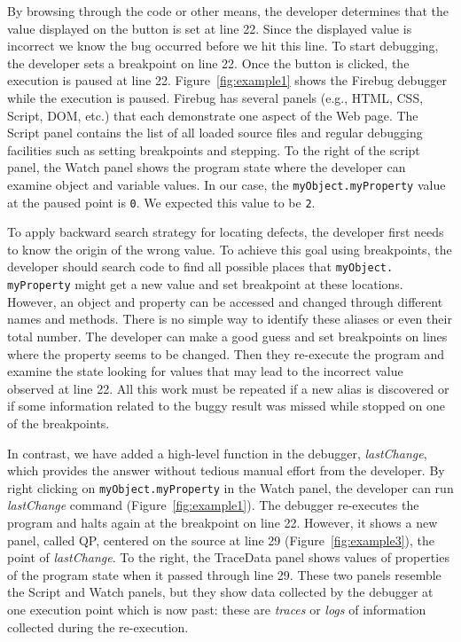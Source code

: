 \documentclass{sig-alternate}
\begin{document}
By browsing through the code or other means\cite{Barton},
 the developer determines that the value displayed on the 
button is set at line 22. Since the displayed value is incorrect we know 
the bug occurred before we hit this line.
To start debugging, the developer sets a breakpoint
on line 22. Once the button is clicked, the execution is paused at line
22. Figure~\ref{fig:example1} shows the Firebug debugger while the
execution is paused. Firebug has several panels (e.g., HTML, CSS,
Script, DOM, etc.) that each demonstrate one aspect of the Web page.
The Script panel contains the list of all loaded source
files and regular debugging facilities such as setting breakpoints and
stepping. To the right of the script panel, the Watch panel shows the program state
where the developer can examine object and variable values. In our case, the
\texttt{myObject.myProperty} value at the paused point is \texttt{0}. We expected this value to be \texttt{2}.


To apply backward search strategy for locating defects, the developer
first needs to know the origin of the wrong value. To achieve this
goal using breakpoints, the developer should search code to find all possible places that
\texttt{myObject. myProperty} might get a new value and set breakpoint at these locations. However, an
object and property can be accessed and changed through different
names and methods. There is no simple way to identify these aliases or
even their total number.  The developer can make a good guess and set
breakpoints on lines where the property seems to be changed. Then they
re-execute the program and examine the state looking for values that
may lead to the incorrect value observed at line 22. All this work
must be repeated if a new alias is discovered or if some
information related to the buggy result was missed while stopped on
one of the breakpoints.

In contrast, we have added a high-level function in the debugger,
\textit{lastChange}, which provides the answer without tedious manual
effort from the developer. By right clicking on
\texttt{myObject.myProperty} in the Watch panel, the developer can run
\textit{lastChange} command (Figure~\ref{fig:example1}). The debugger
re-executes the program and halts again at the breakpoint on line 22.
However, it shows a new panel, called QP, centered on the source at line 29
(Figure~\ref{fig:example3}), the point of \textit{lastChange}.  To
the right, the TraceData panel shows values of properties of the
program state when it passed through line 29.  These two panels
resemble the Script and Watch panels, but they show data collected by
the debugger at one execution point which is now past: these are
\textit{traces} or \textit{logs} of information collected during the re-execution.
\end{document}
